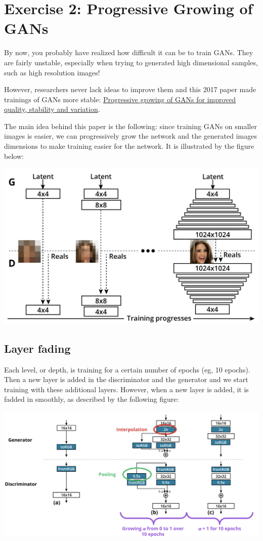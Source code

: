 \section{Exercise 2: Progressive Growing of GANs}

By now, you probably have realized how difficult it can be to train
GANs. They are fairly unstable, especially when trying to generated high
dimensional samples, such as high resolution images! \newline 

However, researchers never lack ideas to improve them and this 2017
paper made trainings of GANs more stable:
\href{https://arxiv.org/pdf/1710.10196.pdf}{Progressive growing of GANs
for improved quality, stability and variation}. \newline

The main idea behind this paper is the following: since training GANs on
smaller images is easier, we can progressively grow the network and the
generated images dimensions to make training easier for the network. It
is illustrated by the figure below:

\includegraphics[width=1\linewidth]{img//genAdvNet//modernGAN/progan2.png}

\subsection{Layer fading}
Each level, or depth, is training for a certain number of epochs (eg, 10
epochs). Then a new layer is added in the discriminator and the
generator and we start training with these additional layers. However,
when a new layer is added, it is fadded in smoothly, as described by the
following figure:

\includegraphics[width=1\linewidth]{img//genAdvNet//modernGAN/layer_fading2.png}

